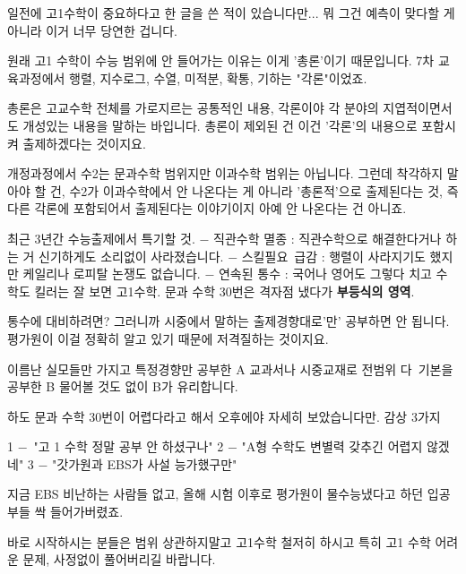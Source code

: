 일전에 고1수학이 중요하다고 한 글을 쓴 적이 있습니다만... 뭐 그건 예측이 맞다할 게 아니라 이거 너무 당연한 겁니다.
\vspace{5mm}

원래 고1 수학이 수능 범위에 안 들어가는 이유는
이게 '총론'이기 때문입니다.
7차 교육과정에서 행렬, 지수로그, 수열, 미적분, 확통, 기하는 "각론"이었죠.
\vspace{5mm}

총론은 고교수학 전체를 가로지르는 공통적인 내용,
각론이야 각 분야의 지엽적이면서도 개성있는 내용을 말하는 바입니다.
총론이 제외된 건 이건 '각론'의 내용으로 포함시켜 출제하겠다는 것이지요.
\vspace{5mm}

개정과정에서 수2는 문과수학 범위지만 이과수학 범위는 아닙니다.
그런데 착각하지 말아야 할 건, 수2가 이과수학에서 안 나온다는 게 아니라 '총론적'으로 출제된다는 것,
즉 다른 각론에 포함되어서 출제된다는 이야기이지 아예 안 나온다는 건 아니죠.
\vspace{5mm}

최근 3년간 수능출제에서 특기할 것.
$-$ 직관수학 멸종 : 직관수학으로 해결한다거나 하는 거 신기하게도 소리없이 사라졌습니다.
$-$ 스킬필요 급감 : 행렬이 사라지기도 했지만 케일리나 로피탈 논쟁도 없습니다.
$-$ 연속된 통수 : 국어나 영어도 그렇다 치고 수학도 킬러는 잘 보면 고1수학. 문과 수학 30번은 격자점 냈다가 \textbf{부등식의 영역}.
\vspace{5mm}

통수에 대비하려면? 그러니까 시중에서 말하는 출제경향대로'만' 공부하면 안 됩니다.
평가원이 이걸 정확히 알고 있기 때문에 저격질하는 것이지요.
\vspace{5mm}

이름난 실모들만 가지고 특정경향만 공부한 A
교과서나 시중교재로 전범위 다 기본을 공부한 B
물어볼 것도 없이 B가 유리합니다.
\vspace{5mm}

하도 문과 수학 30번이 어렵다라고 해서 오후에야 자세히 보았습니다만.
감상 3가지
\vspace{5mm}

1 $-$ "고 1 수학 정말 공부 안 하셨구나"
2 $-$ "A형 수학도 변별력 갖추긴 어렵지 않겠네"
3 $-$ "갓가원과 EBS가 사설 능가했구만"
\vspace{5mm}

지금 EBS 비난하는 사람들 없고, 올해 시험 이후로 평가원이 물수능냈다고 하던 입공부들 싹 들어가버렸죠.
\vspace{5mm}

바로 시작하시는 분들은 범위 상관하지말고 고1수학 철저히 하시고
특히 고1 수학 어려운 문제, 사정없이 풀어버리길 바랍니다.
\vspace{5mm}

